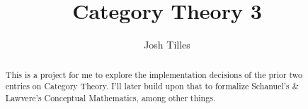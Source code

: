 \documentclass[11pt,a4paper]{article}
\begin{document}
\title{Category Theory 3}
\author{Josh Tilles}
\maketitle

\begin{abstract}
  This is a project for me to explore the implementation decisions of the prior two entries on Category Theory.
  I'll later build upon that to formalize Schanuel's & Lawvere's Conceptual Mathematics, among other things.
\end{abstract}

\tableofcontents





\end{document}
